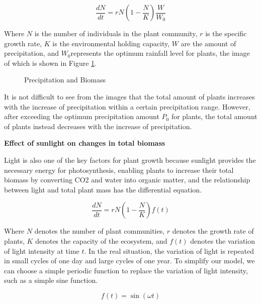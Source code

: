 \documentclass[12pt]{article}
\begin{document}
\begin{equation}
	\frac{dN}{dt} = rN (1 - \frac{N}{K} ) \frac{W} {W_0}
\end{equation}

Where $N$ is the number of individuals in the plant community, $r$ is the specific growth rate, $K$ is the environmental holding capacity, $W$ are the amount of precipitation, and $W_0 $represents the optimum rainfall level for plants, the image of which is shown in Figure \ref{fig:water}.

\begin{figure}[htb]
	\centering
	
	\caption{Precipitation and Biomass}
	\label{fig:water}
\end{figure}

It is not difficult to see from the images that the total amount of plants increases with the increase of precipitation within a certain precipitation range. However, after exceeding the optimum precipitation amount $P_0$ for plants, the total amount of plants instead decreases with the increase of precipitation.

\vspace{0.5cm}

\textbf{Effect of sunlight on changes in total biomass}

\vspace{0.5cm}

Light is also one of the key factors for plant growth because sunlight provides the necessary energy for photosynthesis, enabling plants to increase their total biomass by converting CO2 and water into organic matter, and the relationship between light and total plant mass has the differential equation.

\begin{equation}
	\frac{dN}{dt} = rN(1-\frac{N}{K})f(t)
\end{equation}

Where $N$ denotes the number of plant communities, $r$ denotes the growth rate of plants, $K$ denotes the capacity of the ecosystem, and $f(t)$ denotes the variation of light intensity at time $t$. In the real situation, the variation of light is repeated in small cycles of one day and large cycles of one year. To simplify our model, we can choose a simple periodic function to replace the variation of light intensity, such as a simple sine function.

\begin{equation}
	f(t) = \sin(\omega t)
\end{equation}
\end{document}
